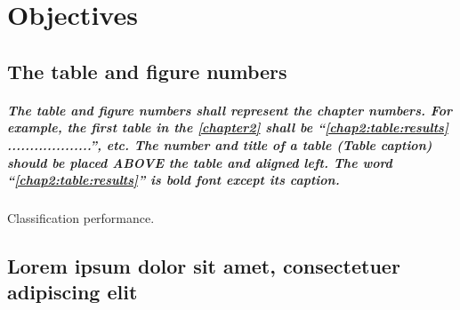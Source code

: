 \chapter{Objectives}		
\label{chapter2}

\section{The table and figure numbers}

\paragraph{
The table and figure numbers shall represent the chapter numbers. For example, the first table in the \autoref{chapter2} shall be ``\autoref{chap2:table:results} ...................'', etc. The number and title of a table (Table caption) should be placed ABOVE the table and aligned left. The word ``\autoref{chap2:table:results}'' is \textbf{bold} font except its caption. 
}

\begin{table}[ht]
\caption{Classification performance.}
\label{chap2:table:results}
\centering
\normalsize\singlespacingplus

\end{table}



\section{Lorem ipsum dolor sit amet, consectetuer adipiscing elit}

\paragraph{
\lipsum[1-2] %
}
